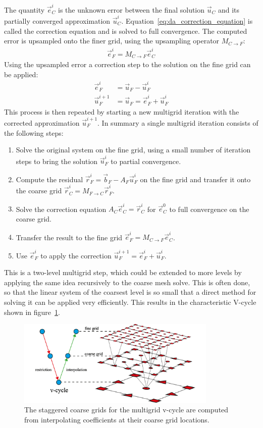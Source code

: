 The quantity $\vec{e}_C^i$ is the unknown error between the final solution $\vec{u}_C$ and its partially converged approximation $\vec{u}_C^i$. Equation~\ref{eq:da_correction_equation} is called the correction equation and is solved to full convergence. The computed error is upsampled onto the finer grid, using the upsampling operator $M_{C\rightarrow F}$:
\begin{align}
\vec{e}_F^i = M_{C\rightarrow F}\vec{e}_C^i
\nonumber
\end{align}
Using the upsampled error a correction step to the solution on the fine grid can be applied:
\begin{align}
\vec{e}_F^i &= \vec{u}_F - \vec{u}_F^i
\nonumber
\\
\vec{u}_F^{i+1} &= \vec{u}_F = \vec{e}_F^i + \vec{u}_F^i
\nonumber
\end{align}
This process is then repeated by starting a new multigrid iteration with the corrected approximation $\vec{u}_F^{i+1}$. In summary a single multigrid iteration consists of the following steps:
\begin{enumerate}
\item Solve the original system on the fine grid, using a small number of iteration steps to bring the solution $\vec{u}_F^i$ to partial convergence.
\item Compute the residual $\vec{r}_F^i=\vec{b}_F - A_F\vec{u}_F^i$ on the fine grid and transfer it onto the coarse grid $\vec{r}_C^i = M_{F\rightarrow C}\vec{r}_F^i$.
\item Solve the correction equation $A_C\vec{e}_C^i = \vec{r}_C^i$ for $\vec{e}_C^0$ to full convergence on the coarse grid.
\item Transfer the result to the fine grid $\vec{e}_F^i = M_{C\rightarrow F}\vec{e}_C^i$.
\item Use $\vec{e}_F^i$ to apply the correction $\vec{u}_F^{i+1} =  \vec{e}_F^i + \vec{u}_F^i$.
\end{enumerate}
This is a two-level multigrid step, which could be extended to more levels by applying the same idea recursively to the coarse mesh solve. This is often done, so that the linear system of the coarsest level is so small that a direct method for solving it can be applied very efficiently. This results in the characteristic V-cycle shown in figure~\ref{fig:da_solver_multigrid_vcycles}.
\begin{figure}[h]
\centering
\includegraphics[width=0.85\textwidth]{05_diffusion_approximation/figures/fig_vcycle.pdf}
\caption{The staggered coarse grids for the multigrid v-cycle are computed from interpolating coefficients at their coarse grid locations.}
\label{fig:da_solver_multigrid_vcycles}
\end{figure}

